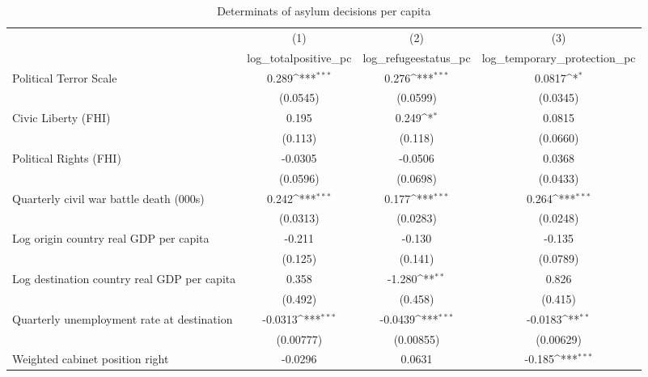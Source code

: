 \begin{table}[htbp]\centering
\def\sym#1{\ifmmode^{#1}\else\(^{#1}\)\fi}
\caption{Determinats of asylum decisions per capita}
\begin{tabular}{l*{3}{c}}
\hline\hline
                    &\multicolumn{1}{c}{(1)}&\multicolumn{1}{c}{(2)}&\multicolumn{1}{c}{(3)}\\
                    &\multicolumn{1}{c}{log\_totalpositive\_pc}&\multicolumn{1}{c}{log\_refugeestatus\_pc}&\multicolumn{1}{c}{log\_temporary\_protection\_pc}\\
\hline
Political Terror Scale&       0.289\sym{***}&       0.276\sym{***}&      0.0817\sym{*}  \\
                    &    (0.0545)         &    (0.0599)         &    (0.0345)         \\
[1em]
Civic Liberty (FHI) &       0.195         &       0.249\sym{*}  &      0.0815         \\
                    &     (0.113)         &     (0.118)         &    (0.0660)         \\
[1em]
Political Rights (FHI)&     -0.0305         &     -0.0506         &      0.0368         \\
                    &    (0.0596)         &    (0.0698)         &    (0.0433)         \\
[1em]
Quarterly civil war battle death (000s)&       0.242\sym{***}&       0.177\sym{***}&       0.264\sym{***}\\
                    &    (0.0313)         &    (0.0283)         &    (0.0248)         \\
[1em]
Log origin country real GDP per capita&      -0.211         &      -0.130         &      -0.135         \\
                    &     (0.125)         &     (0.141)         &    (0.0789)         \\
[1em]
Log destination country real GDP per capita&       0.358         &      -1.280\sym{**} &       0.826         \\
                    &     (0.492)         &     (0.458)         &     (0.415)         \\
[1em]
Quarterly unemployment rate at destination&     -0.0313\sym{***}&     -0.0439\sym{***}&     -0.0183\sym{**} \\
                    &   (0.00777)         &   (0.00855)         &   (0.00629)         \\
[1em]
Weighted cabinet position right&     -0.0296         &      0.0631         &      -0.185\sym{***}\\

\end{tabular}
\end{table}
